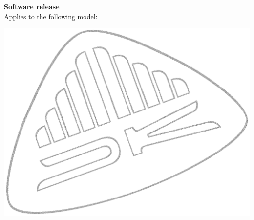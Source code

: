 \pagestyle{empty}
\begin{flushright}
\tiny{{\Date}} \\[7cm]
\end{flushright}

\begin{center}
\Huge{\textbf{}}\\[.2cm]
\Large{\textbf{{\selectfont Software release \Version}}}\\[1cm]
\small{Applies to the following model:\\\model}
\end{center}

\vfill

\begin{flushright}  
\includegraphics[scale=2]{fig/DK-Logo_gray}
\end{flushright}


\newpage

\noindent
\textbf{\Title}
\vspace{1cm}

\noindent

